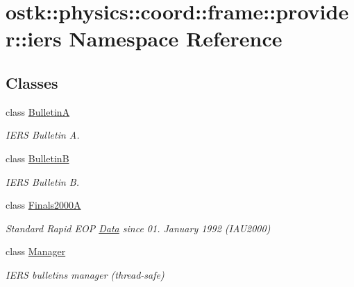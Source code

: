 \hypertarget{namespaceostk_1_1physics_1_1coord_1_1frame_1_1provider_1_1iers}{}\section{ostk\+:\+:physics\+:\+:coord\+:\+:frame\+:\+:provider\+:\+:iers Namespace Reference}
\label{namespaceostk_1_1physics_1_1coord_1_1frame_1_1provider_1_1iers}
\subsection*{Classes}
\begin{DoxyCompactItemize}
\item 
class \hyperlink{classostk_1_1physics_1_1coord_1_1frame_1_1provider_1_1iers_1_1_bulletin_a}{BulletinA}
\begin{DoxyCompactList}\small\item\em I\+E\+RS Bulletin A. \end{DoxyCompactList}\item 
class \hyperlink{classostk_1_1physics_1_1coord_1_1frame_1_1provider_1_1iers_1_1_bulletin_b}{BulletinB}
\begin{DoxyCompactList}\small\item\em I\+E\+RS Bulletin B. \end{DoxyCompactList}\item 
class \hyperlink{classostk_1_1physics_1_1coord_1_1frame_1_1provider_1_1iers_1_1_finals2000_a}{Finals2000A}
\begin{DoxyCompactList}\small\item\em Standard Rapid E\+OP \hyperlink{structostk_1_1physics_1_1coord_1_1frame_1_1provider_1_1iers_1_1_finals2000_a_1_1_data}{Data} since 01. January 1992 (I\+A\+U2000) \end{DoxyCompactList}\item 
class \hyperlink{classostk_1_1physics_1_1coord_1_1frame_1_1provider_1_1iers_1_1_manager}{Manager}
\begin{DoxyCompactList}\small\item\em I\+E\+RS bulletins manager (thread-\/safe) \end{DoxyCompactList}\end{DoxyCompactItemize}
